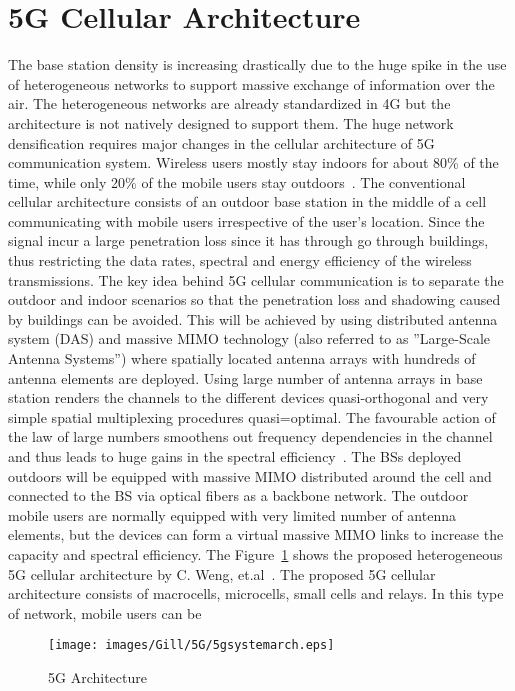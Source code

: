 \section{5G Cellular Architecture}
The base station density is increasing drastically due to the huge spike in the use of heterogeneous networks to support massive exchange of information over the air. The heterogeneous networks are already standardized in 4G but the architecture is not natively designed to support them. The huge network densification requires major changes in the cellular architecture of 5G communication system. Wireless users mostly stay indoors for about 80\% of the time, while only 20\% of the mobile users stay outdoors~\cite{4623708}. The conventional cellular architecture consists of an outdoor base station in the middle of a cell communicating with mobile users irrespective of the user's location. Since the signal incur a large penetration loss since it has through go through buildings, thus restricting the data rates, spectral and energy efficiency of the wireless transmissions. The key idea behind 5G cellular communication is to separate the outdoor and indoor scenarios so that the penetration loss and shadowing caused by buildings can be avoided. This will be achieved by using distributed antenna system (DAS) and massive MIMO technology (also referred to as ''Large-Scale Antenna Systems'') where spatially located antenna arrays with hundreds of antenna elements are deployed. Using large number of antenna arrays in base station renders the channels to the different devices quasi-orthogonal and very simple spatial multiplexing procedures quasi=optimal. The favourable action of the law of large numbers smoothens out frequency dependencies in the channel and thus leads to huge gains in the spectral efficiency~\cite{Boccardi2014}. The BSs deployed outdoors will be equipped with massive MIMO distributed around the cell and connected to the BS via optical fibers as a backbone network. The outdoor mobile users are normally equipped with very limited number of antenna elements, but
the devices can form a virtual massive MIMO links to increase the capacity and spectral efficiency. The Figure~\ref{5garch} shows the proposed heterogeneous 5G cellular architecture by C. Weng, et.al~\cite{Wang2014}. The proposed 5G cellular architecture consists of macrocells, microcells, small cells and relays. In this type of network, mobile users can be 
 
\begin{figure}[!ht]
	\centering
\texttt{[image: images/Gill/5G/5gsystemarch.eps]}
	\caption{5G Architecture}
	\label{5garch}
\end{figure}

